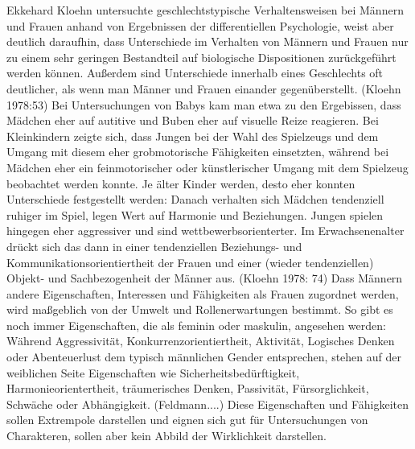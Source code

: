 Ekkehard Kloehn untersuchte geschlechtstypische Verhaltensweisen bei Männern und Frauen anhand von Ergebnissen der differentiellen Psychologie, weist aber deutlich daraufhin, dass Unterschiede im Verhalten von Männern und Frauen nur zu einem sehr geringen Bestandteil auf biologische Dispositionen zurückgeführt werden können. Außerdem sind Unterschiede innerhalb eines Geschlechts oft deutlicher, als wenn man Männer und Frauen einander gegenüberstellt. (Kloehn 1978:53) 
Bei Untersuchungen von Babys kam man etwa zu den Ergebissen, dass Mädchen eher auf autitive und Buben eher auf visuelle Reize reagieren. Bei Kleinkindern zeigte sich, dass Jungen bei der Wahl des Spielzeugs und dem Umgang mit diesem eher grobmotorische Fähigkeiten einsetzten, während bei Mädchen eher ein feinmotorischer oder künstlerischer Umgang mit dem Spielzeug beobachtet werden konnte. Je älter Kinder werden, desto eher konnten Unterschiede festgestellt werden: Danach verhalten sich Mädchen tendenziell ruhiger im Spiel, legen Wert auf Harmonie und Beziehungen. Jungen spielen hingegen eher aggressiver und sind wettbewerbsorienterter. Im Erwachsenenalter drückt sich das dann in einer tendenziellen Beziehungs- und Kommunikationsorientiertheit der Frauen und einer (wieder tendenziellen) Objekt- und Sachbezogenheit der Männer aus. (Kloehn 1978: 74) Dass Männern andere Eigenschaften, Interessen und Fähigkeiten als Frauen zugordnet werden, wird maßgeblich von der Umwelt und Rollenerwartungen bestimmt. So gibt es noch immer Eigenschaften, die als feminin oder maskulin, angesehen werden: Während Aggressivität, Konkurrenzorientiertheit, Aktivität, Logisches Denken oder Abenteuerlust dem typisch männlichen Gender entsprechen, stehen auf der weiblichen Seite Eigenschaften wie Sicherheitsbedürftigkeit, Harmonieorientertheit, träumerisches Denken, Passivität, Fürsorglichkeit, Schwäche oder Abhängigkeit. (Feldmann....) Diese Eigenschaften und Fähigkeiten sollen Extrempole darstellen und eignen sich gut für Untersuchungen von Charakteren, sollen aber kein Abbild der Wirklichkeit darstellen.

